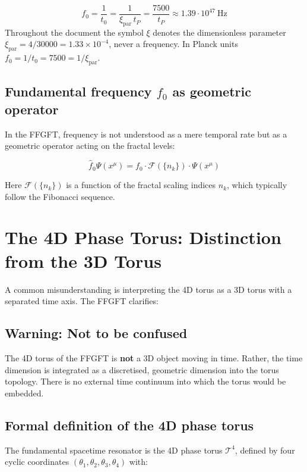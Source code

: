 	\begin{equation}
		f_0 = \frac{1}{t_0} = \frac{1}{\xi_{\text{par}}\, t_P} = \frac{7500}{t_P} \approx 1.39 \cdot 10^{47}~\text{Hz}
	\end{equation}
	Throughout the document the symbol $\xi$ denotes the dimensionless parameter $\xi_{\text{par}} = 4/30000 = 1.33\times 10^{-4}$, never a frequency. In Planck units $f_0 = 1/t_0 = 7500 = 1/\xi_{\text{par}}$.
	
	\subsection{Fundamental frequency $f_0$ as geometric operator}
	
	In the FFGFT, frequency is not understood as a mere temporal rate but as a geometric operator acting on the fractal levels:
	
	\begin{equation}
		\hat{f}_0 \Psi(x^\mu) = f_0 \cdot \mathcal{F}(\{n_k\}) \cdot \Psi(x^\mu)
	\end{equation}
	
	Here $\mathcal{F}(\{n_k\})$ is a function of the fractal scaling indices $n_k$, which typically follow the Fibonacci sequence.
	
	\section{The 4D Phase Torus: Distinction from the 3D Torus}
	
	A common misunderstanding is interpreting the 4D torus as a 3D torus with a separated time axis. The FFGFT clarifies:
	
	\subsection{Warning: Not to be confused}
	
	The 4D torus of the FFGFT is \textbf{not} a 3D object moving in time. Rather, the time dimension is integrated as a discretised, geometric dimension into the torus topology. There is no external time continuum into which the torus would be embedded.
	
	\subsection{Formal definition of the 4D phase torus}
	
	The fundamental spacetime resonator is the 4D phase torus $\mathcal{T}^4$, defined by four cyclic coordinates $(\theta_1, \theta_2, \theta_3, \theta_4)$ with:
	
